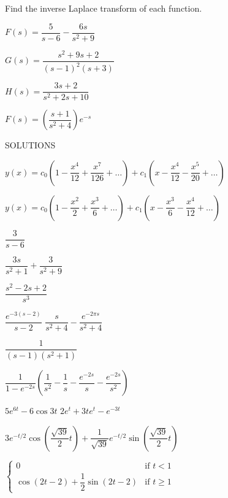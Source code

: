 \documentclass[12pt]{exam}
\begin{document}
Find the inverse Laplace transform of each function.

\begin{questions}
\setcounter{question}{9}
\question
$F(s) = \dfrac{5}{s-6} - \dfrac{6s}{s^2+9}$

\question
$G(s) = \dfrac{s^2 + 9s +2}{(s-1)^2(s+3)}$

\question
$H(s) = \dfrac{3s + 2}{s^2 + 2s + 10}$

\question
$F(s) = \left( \dfrac{s+1}{s^2 + 4} \right) e^{-s}$

\end{questions}


\clearpage
SOLUTIONS

\begin{questions}
\question
$y(x) = c_0 \left( 1 - \dfrac{x^4}{12} + \dfrac{x^7}{126} + \ldots \right) +
    	c_1 \left( x - \dfrac{x^4}{12} - \dfrac{x^5}{20} + \ldots \right) $

\question
$y(x) = c_0 \left( 1 - \dfrac{x^2}{2} + \dfrac{x^3}{6} + \ldots \right) +
    	c_1 \left( x - \dfrac{x^3}{6} - \dfrac{x^4}{12} + \ldots \right) $

\question
$\dfrac{3}{s-6}$

\question
$\dfrac{3s}{s^2 + 1} + \dfrac{3}{s^2+9}$

\question
$\dfrac{s^2 - 2s + 2}{s^3}$

\question
$\dfrac{e^{-3(s-2)}}{s-2}$
\question
$\dfrac{s}{s^2+4} - \dfrac{e^{-2\pi s}}{s^2+4}$

\question
$\dfrac{1}{(s-1)(s^2+1)}$

\question
$\dfrac{1}{1 - e^{-2s}} \left( \dfrac{1}{s^2} - \dfrac{1}{s} - \dfrac{e^{-2s}}{s} - \dfrac{e^{-2s}}{s^2} \right)$

\question
$5e^{6t} - 6 \cos 3t$
\question
$2e^t + 3te^t - e^{-3t}$

\question
$3 e^{-t/2} \cos \left( \dfrac{\sqrt{39}}{2} t \right) + 
	\dfrac{1}{\sqrt{39}} e^{-t/2} \sin \left( \dfrac{\sqrt{39}}{2} t \right)$
 
\question
$\begin{cases}
0 & \mbox{if } t < 1 \\
\cos \left( 2t - 2 \right) + 
	\dfrac{1}{2} \sin \left( 2t - 2 \right) & \mbox{if } t \ge 1
\end{cases}$
\end{questions}
\end{document}
